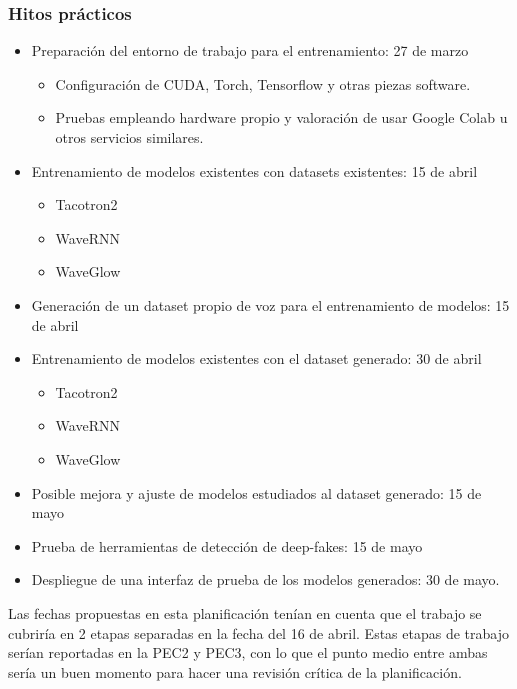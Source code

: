 \subsubsection{Hitos prácticos}
\begin{itemize}
    \item Preparación del entorno de trabajo para el entrenamiento: 27 de marzo
    \begin{itemize}
        \item Configuración de CUDA, Torch, Tensorflow y otras piezas software.
        \item Pruebas empleando hardware propio y valoración de usar Google Colab u otros servicios similares.
    \end{itemize}
    \item Entrenamiento de modelos existentes con datasets existentes: 15 de abril
    \begin{itemize}
        \item Tacotron2
        \item WaveRNN
        \item WaveGlow
    \end{itemize}
    \item Generación de un dataset propio de voz para el entrenamiento de modelos: 15 de abril
    
    \item Entrenamiento de modelos existentes con el dataset generado: 30 de abril
    \begin{itemize}
        \item Tacotron2
        \item WaveRNN
        \item WaveGlow
    \end{itemize}
    
    \item Posible mejora y ajuste de modelos estudiados al dataset generado: 15 de mayo
    \item Prueba de herramientas de detección de deep-fakes: 15 de mayo
    \item Despliegue de una interfaz de prueba de los modelos generados: 30 de mayo.
    
\end{itemize}

Las fechas propuestas en esta planificación tenían en cuenta que el trabajo se cubriría en 2 etapas separadas en la fecha del 16 de abril. Estas etapas de trabajo serían reportadas en la PEC2 y PEC3, con lo que el punto medio entre ambas sería un buen momento para hacer una revisión crítica de la planificación.

